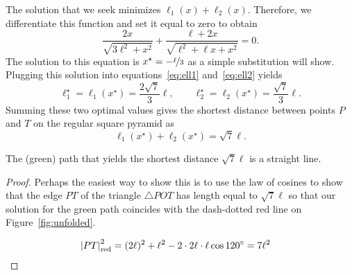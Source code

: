 The solution that we seek minimizes $\ell_1(x) + \ell_2(x)$. Therefore, we
differentiate this function and set it equal to zero to obtain \[
\frac{2x}{\sqrt{3\ell^2 + x^2}} + \frac{\ell+2x}{\sqrt{\ell^2 + \ell x + x^2}} =
0. \] The solution to this equation is $x^\star = -\nicefrac{\ell}{3}$ as a
simple substitution will show. Plugging this solution into
equations~\eqref{eq:ell1} and~\eqref{eq:ell2} yields \[ \ell_1^\star =
\ell_1(x^\star) = \frac{2\sqrt{7}}{3}\ell, \qquad \ell_2^\star =
\ell_2(x^\star)= \frac{\sqrt{7}}{3}\ell. \] Summing these two optimal values
gives the shortest distance between points $P$ and $T$ on the regular square
pyramid as \[ \ell_1(x^\star) + \ell_2(x^\star) = \sqrt{7}\ell. \]

\begin{lem}
    The (green) path that yields the shortest distance $\sqrt{7}\ell$ is a
    straight line.
\end{lem}

\begin{proof}
    Perhaps the easiest way to show this is to use the law of cosines to show
    that the edge $PT$ of the triangle $\triangle POT$ has length equal to
    $\sqrt{7}\ell$ so that our solution for the green path coincides with the
    dash-dotted red line on Figure~\ref{fig:unfolded}.

    \begin{align*}
        \left|{PT}\right|_{\text{red}}^2 &= (2\ell)^2 + \ell^2 - 2 \cdot 2\ell \cdot \ell
        \cos{120^\circ} = 7\ell^2
    \end{align*}
\end{proof}
